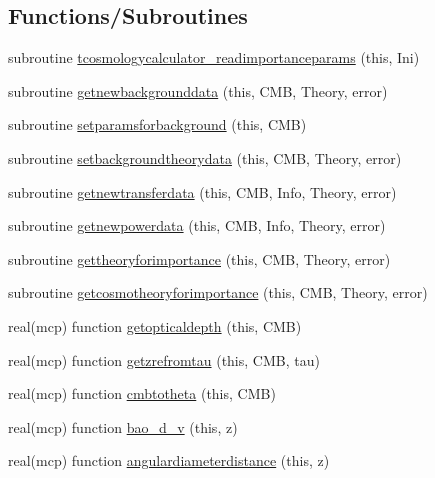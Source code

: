 \subsection*{Functions/\+Subroutines}
\begin{DoxyCompactItemize}
\item 
subroutine \mbox{\hyperlink{namespacecalculator__cosmology_a8df979f2a96e1c2b9624e105619464c2}{tcosmologycalculator\+\_\+readimportanceparams}} (this, Ini)
\item 
subroutine \mbox{\hyperlink{namespacecalculator__cosmology_a9b28cf77b06f92cdf1260e0a1f8a72c1}{getnewbackgrounddata}} (this, C\+MB, Theory, error)
\item 
subroutine \mbox{\hyperlink{namespacecalculator__cosmology_aabddd5a422eef22f8d13c1df292cc749}{setparamsforbackground}} (this, C\+MB)
\item 
subroutine \mbox{\hyperlink{namespacecalculator__cosmology_a8f03c8f23e837020c788389a8ffb4be3}{setbackgroundtheorydata}} (this, C\+MB, Theory, error)
\item 
subroutine \mbox{\hyperlink{namespacecalculator__cosmology_a96e555c628aadff1d707242e238d09f8}{getnewtransferdata}} (this, C\+MB, Info, Theory, error)
\item 
subroutine \mbox{\hyperlink{namespacecalculator__cosmology_a456c87c218951defda2a9bcf4f23abb8}{getnewpowerdata}} (this, C\+MB, Info, Theory, error)
\item 
subroutine \mbox{\hyperlink{namespacecalculator__cosmology_a98a6aa3eeac24c242c935e0740b470d8}{gettheoryforimportance}} (this, C\+MB, Theory, error)
\item 
subroutine \mbox{\hyperlink{namespacecalculator__cosmology_a520171f2409b797206b45a9b2f25ac22}{getcosmotheoryforimportance}} (this, C\+MB, Theory, error)
\item 
real(mcp) function \mbox{\hyperlink{namespacecalculator__cosmology_a9907b8c61d20213e8026443a5043530f}{getopticaldepth}} (this, C\+MB)
\item 
real(mcp) function \mbox{\hyperlink{namespacecalculator__cosmology_a3f26a3af3732dbfea7715d565b44a385}{getzrefromtau}} (this, C\+MB, tau)
\item 
real(mcp) function \mbox{\hyperlink{namespacecalculator__cosmology_a6178a84302763ba24c2283bf6e8e5b2b}{cmbtotheta}} (this, C\+MB)
\item 
real(mcp) function \mbox{\hyperlink{namespacecalculator__cosmology_ab4785ac8ce58853984614bac368590aa}{bao\+\_\+d\+\_\+v}} (this, z)
\item 
real(mcp) function \mbox{\hyperlink{namespacecalculator__cosmology_a703b9e272151719cca42f7d37d7d403f}{angulardiameterdistance}} (this, z)

\end{DoxyCompactItemize}
